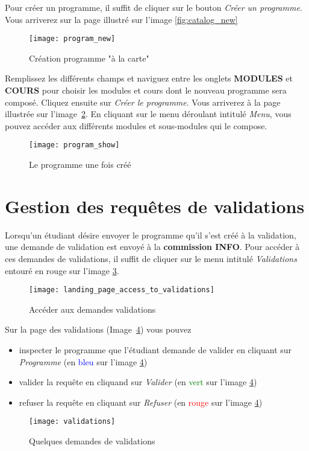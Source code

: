 Pour créer un programme, il suffit de cliquer sur le  bouton \textit{Créer un programme}. Vous arriverez sur la page illustré sur l'image \ref{fig:catalog_new}

\begin{figure}[H]
\centering
\caption{Création programme "à la carte"}
\label{fig:program_new}
\texttt{[image: program\_new]}
\end{figure}

Remplissez les différents champs et naviguez entre les onglets \textbf{MODULES} et \textbf{COURS} pour choisir les modules et cours dont le nouveau programme sera composé. Cliquez ensuite sur \textit{Créer le programme}. Vous arriverez à la page illustrée sur l'image~\ref{fig:program_show}. En cliquant sur le menu déroulant intitulé \textit{Menu}, vous pouvez accéder aux différents modules et sous-modules qui le compose. 

\begin{figure}[H]
\centering
\caption{Le programme une fois créé}
\label{fig:program_show}
\texttt{[image: program\_show]}
\end{figure}

\section{Gestion des requêtes de validations}
Lorsqu'un étudiant désire envoyer le programme qu'il s'est créé à la validation, une demande de validation est envoyé à la \textbf{commission INFO}. Pour accéder à ces demandes de validations, 
il suffit de cliquer sur le menu intitulé \textit{Validations} entouré en rouge sur l'image \ref{fig:landing_page_access_to_validations}.

\begin{figure}[H]
\centering
\caption{Accéder aux demandes validations}
\label{fig:landing_page_access_to_validations}
\texttt{[image: landing\_page\_access\_to\_validations]}
\end{figure}

Sur la page des validations (Image~\ref{fig:validations}) vous pouvez
\begin{itemize}
\item inspecter le programme que l'étudiant demande de valider en cliquant sur \textit{Programme} (en \textcolor{blue}{bleu} sur l'image \ref{fig:validations})
\item valider la requête en cliquand sur \textit{Valider} (en \textcolor{green}{vert} sur l'image \ref{fig:validations})
\item refuser la requête en cliquant sur \textit{Refuser} (en \textcolor{red}{rouge} sur l'image \ref{fig:validations})
\end{itemize}

\begin{figure}[H]
\centering
\caption{Quelques demandes de validations}
\label{fig:validations}
\texttt{[image: validations]}

\end{figure}